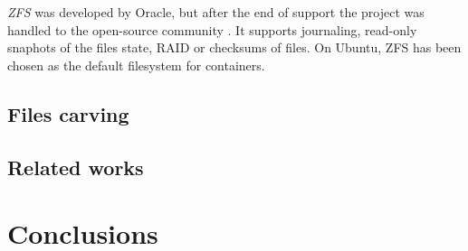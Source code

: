 \documentclass{acm_proc_article-sp}
\begin{document}
{\it ZFS} \cite{zfs} was developed by Oracle, but after the end of support the project was handled to the open-source community \cite{openzfs}. It supports journaling, read-only snaphots of the files state, RAID or checksums of files. On Ubuntu, ZFS has been chosen as the default filesystem for containers.

\subsection{Files carving}

\subsection{Related works}

\section{Conclusions}




\balancecolumns
\end{document}
